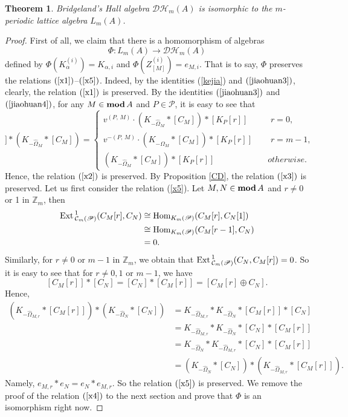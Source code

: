 \documentclass[reqno,12pt]{amsart}
\numberwithin{equation}{section}
\theoremstyle{plain}
\newtheorem{theorem}{\bf Theorem}[section]
\theoremstyle{definition}
\begin{document}
\begin{theorem}\label{main}
Bridgeland's Hall algebra $\mathcal {D}\mathcal {H}_m(A)$ is isomorphic to the $m$-periodic lattice algebra $L_m(A)$.
\end{theorem}
\begin{proof}
First of all, we claim that there is a homomorphism of algebras
$$\Phi: L_m(A)\longrightarrow \mathcal {D}\mathcal {H}_m(A)$$
defined by $\Phi(K_\alpha^{(i)})=K_{\alpha,i}$ and $\Phi(Z_{[M]}^{(i)})=e_{M,i}$. That is to say, $\Phi$ preserves the relations $(\ref{x1})$--$(\ref{x5})$. Indeed, by the identities (\ref{kejia}) and $(\ref{jiaohuan3})$, clearly, the relation $(\ref{x1})$ is preserved.
By the identities $(\ref{jiaohuan3})$ and $(\ref{jiaohuan4})$, for any $M\in {\mbox{\rm \textbf{mod}}\,} A$ and $P\in\mathscr{P}$, it is easy to see that
\begin{equation}
[K_P[r]]\ast (K_{-\hat{\Omega}_M}\ast[C_M])=\begin{cases}
v^{(P,\,M)}\cdot (K_{-\hat{\Omega}_M}\ast[C_M])\ast [K_P[r]]\quad &\text{~$r=0$},\\
v^{-(P,\,M)}\cdot (K_{-\hat{\Omega}_M}\ast[C_M])\ast [K_P[r]]\quad &\text{~$r=m-1$},\\
(K_{-\hat{\Omega}_M}\ast[C_M])\ast [K_P[r]] & {otherwise.}
\end{cases}\end{equation}
Hence, the relation $(\ref{x2})$ is preserved. By Proposition \ref{CD}, the relation $(\ref{x3})$ is preserved.
Let us first consider the relation (\ref{x5}). Let $M,N\in{\mbox{\rm \textbf{mod}}\,} A$ and $r\neq 0$ or 1 in $\mathbb{Z}_m$, then
\begin{equation}\begin{split}
{\mbox{\rm Ext}\,}^1_{\mathcal{C}_m(\mathscr{P})}(C_M[r],C_N)&\cong{\mbox{\rm Hom}}_{K_m(\mathscr{P})}(C_M[r],C_N[1])\\
&\cong{\mbox{\rm Hom}}_{K_m(\mathscr{P})}(C_M[r-1],C_N)\\&=0.\end{split}\end{equation}
Similarly, for $r\neq 0$ or $m-1$ in $\mathbb{Z}_m$, we obtain that ${\mbox{\rm Ext}\,}^1_{\mathcal{C}_m(\mathscr{P})}(C_N,C_M[r])=0$. So it is easy to see that for $r\neq0, 1$ or $m-1$, we have $$[C_M[r]]\ast[C_N]=[C_N]\ast[C_M[r]]=[C_M[r]\oplus C_N].$$
Hence, \begin{equation}\begin{split}
(K_{-\hat{\Omega}_{M,r}}\ast[C_M[r]])\ast(K_{-\hat{\Omega}_N}\ast[C_N])&=
K_{-\hat{\Omega}_{M,r}}\ast K_{-\hat{\Omega}_N}\ast[C_M[r]]\ast[C_N]\\
&=K_{-\hat{\Omega}_{M,r}}\ast K_{-\hat{\Omega}_N}\ast[C_N]\ast[C_M[r]]\\
&=K_{-\hat{\Omega}_N}\ast K_{-\hat{\Omega}_{M,r}}\ast[C_N]\ast[C_M[r]]\\
&=(K_{-\hat{\Omega}_N}\ast[C_N])\ast (K_{-\hat{\Omega}_{M,r}}\ast[C_M[r]]).
\end{split}\end{equation}
Namely, $e_{M,r}\ast e_N=e_N\ast e_{M,r}$. So the relation $(\ref{x5})$ is preserved. We remove the proof of the relation $(\ref{x4})$ to the next section and prove that $\Phi$ is an isomorphism right now.


\end{proof}
\end{document}
